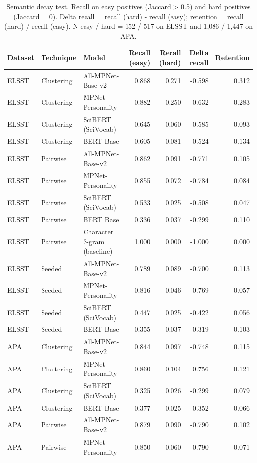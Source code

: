 \begin{table}[ht]
\centering
\small
\caption{Semantic decay test. Recall on easy positives (Jaccard > 0.5) and hard positives (Jaccard = 0). Delta recall = recall (hard) - recall (easy); retention = recall (hard) / recall (easy). N easy / hard = 152 / 517 on ELSST and 1,086 / 1,447 on APA.}
\label{tab:table3_semantic_decay}
\begin{tabular}{lllrrrr}
\toprule
Dataset & Technique & Model & Recall (easy) & Recall (hard) & Delta recall & Retention \\
\midrule
ELSST & Clustering & All-MPNet-Base-v2 & 0.868 & 0.271 & -0.598 & 0.312 \\
ELSST & Clustering & MPNet-Personality & 0.882 & 0.250 & -0.632 & 0.283 \\
ELSST & Clustering & SciBERT (SciVocab) & 0.645 & 0.060 & -0.585 & 0.093 \\
ELSST & Clustering & BERT Base & 0.605 & 0.081 & -0.524 & 0.134 \\
ELSST & Pairwise & All-MPNet-Base-v2 & 0.862 & 0.091 & -0.771 & 0.105 \\
ELSST & Pairwise & MPNet-Personality & 0.855 & 0.072 & -0.784 & 0.084 \\
ELSST & Pairwise & SciBERT (SciVocab) & 0.533 & 0.025 & -0.508 & 0.047 \\
ELSST & Pairwise & BERT Base & 0.336 & 0.037 & -0.299 & 0.110 \\
ELSST & Pairwise & Character 3-gram (baseline) & 1.000 & 0.000 & -1.000 & 0.000 \\
ELSST & Seeded & All-MPNet-Base-v2 & 0.789 & 0.089 & -0.700 & 0.113 \\
ELSST & Seeded & MPNet-Personality & 0.816 & 0.046 & -0.769 & 0.057 \\
ELSST & Seeded & SciBERT (SciVocab) & 0.447 & 0.025 & -0.422 & 0.056 \\
ELSST & Seeded & BERT Base & 0.355 & 0.037 & -0.319 & 0.103 \\
APA & Clustering & All-MPNet-Base-v2 & 0.844 & 0.097 & -0.748 & 0.115 \\
APA & Clustering & MPNet-Personality & 0.860 & 0.104 & -0.756 & 0.121 \\
APA & Clustering & SciBERT (SciVocab) & 0.325 & 0.026 & -0.299 & 0.079 \\
APA & Clustering & BERT Base & 0.377 & 0.025 & -0.352 & 0.066 \\
APA & Pairwise & All-MPNet-Base-v2 & 0.879 & 0.090 & -0.790 & 0.102 \\
APA & Pairwise & MPNet-Personality & 0.850 & 0.060 & -0.790 & 0.071 \\

\end{tabular}
\end{table}

